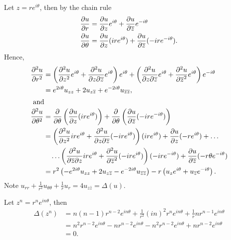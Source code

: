 \documentclass{homework}
\begin{document}
\begin{solution}
Let $z = re^{i\theta}$, then by the chain rule
\begin{align*}
  \frac{\partial u}{\partial r} &= \frac{\partial u}{\partial z} e^{i\theta} + \frac{\partial u}{\partial \overline z} e^{-i\theta}\\
  \frac{\partial u}{\partial \theta} &= \frac{\partial u}{\partial z} (i re^{i\theta}) + \frac{\partial u}{\partial \overline z} (-i re^{-i\theta}).\\
\end{align*}
\vspace{-1cm}
Hence,
\begin{align*}
  \frac{\partial^2 u}{\partial r^2} 
  &= \left(\frac{\partial^2 u}{\partial z^2} e^{i\theta} + \frac{\partial^2 u}{\partial z\partial \overline z} e^{i\theta}\right) e^{i\theta} + \left(\frac{\partial^2 u}{\partial z\partial \overline z} e^{i\theta} + \frac{\partial^2 u}{\partial \overline z^2} e^{i\theta}\right) e^{-i\theta}\\
  &= e^{2i\theta} u_{zz} + 2 u_{z\overline z} + e^{-2i\theta} u_{\overline z\overline z},\\
  \intertext{ and }
  \frac{\partial^2 u}{\partial \theta^2} 
  &= \frac{\partial}{\partial \theta}\left(\frac{\partial u}{\partial z} (i re^{i\theta})\right) + \frac{\partial}{\partial \theta}\left(\frac{\partial u}{\partial \overline z} (-i re^{-i\theta})\right)\\
  &= \left(\frac{\partial^2 u}{\partial z^2} i re^{i\theta} + \frac{\partial^2 u}{\partial z\partial \overline z} (-i re^{i\theta})\right) (i re^{i\theta}) + \frac{\partial u}{\partial z}(-re^{i\theta}) + \dots\\
  &\quad \dots  \left(\frac{\partial^2 u}{\partial \overline z\partial z} i re^{i\theta} + \frac{\partial^2 u}{\partial \overline z^2} (-i re^{i\theta})\right) (-i re^{-i\theta}) + \frac{\partial u}{\partial \overline z} (-r\theta e^{-i\theta})\\
  &= r^2\left(-e^{2i\theta} u_{zz} + 2 u_{z\overline z} - e^{-2i\theta} u_{\overline z\overline z}\right) - r\left( u_ze^{i\theta} + u_{\overline z}e^{-i\theta}\right).\\
\end{align*}
Note $u_{rr} + \frac1{r^2} u_{\theta\theta} + \frac 1r u_{r} = 4 u_{z\bar z} = \Delta(u)$.
\end{solution}


\begin{solution}
  Let $z^n = r^n e^{in\theta}$, then
  \begin{align*}
    \Delta(z^n) 
    &= n(n-1)r^{n-2}e^{in\theta} + \frac 1{r^2} (in)^2 r^n e^{in\theta} + \frac 1r n r^{n-1} e^{in\theta}\\
    &= n^2r^{n-2}e^{in\theta} -nr^{n-2}e^{in\theta} - n^2 r^{n-2} e^{in\theta} + n r^{n-2} e^{in\theta}\\
    &= 0.
  \end{align*}
\end{solution}
\end{document}
